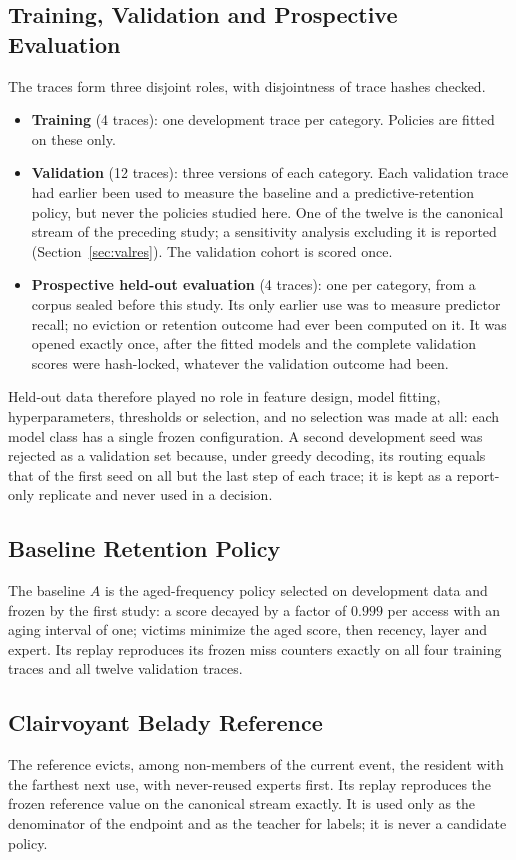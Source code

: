 \documentclass[11pt]{article}
\theoremstyle{plain}
\theoremstyle{definition}
\begin{document}
\subsection{Training, Validation and Prospective Evaluation}
\label{sec:splits}
The traces form three disjoint roles, with disjointness of trace hashes checked.
\begin{itemize}
\item \textbf{Training} (4 traces): one development trace per category. Policies are fitted on these only.
\item \textbf{Validation} (12 traces): three versions of each category. Each validation trace had earlier been used to measure the baseline and a predictive-retention policy, but never the policies studied here. One of the twelve is the canonical stream of the preceding study; a sensitivity analysis excluding it is reported (Section~\ref{sec:valres}). The validation cohort is scored once.
\item \textbf{Prospective held-out evaluation} (4 traces): one per category, from a corpus sealed before this study. Its only earlier use was to measure predictor recall; no eviction or retention outcome had ever been computed on it. It was opened exactly once, after the fitted models and the complete validation scores were hash-locked, whatever the validation outcome had been.
\end{itemize}
Held-out data therefore played no role in feature design, model fitting, hyperparameters, thresholds or selection, and no selection was made at all: each model class has a single frozen configuration. A second development seed was rejected as a validation set because, under greedy decoding, its routing equals that of the first seed on all but the last step of each trace; it is kept as a report-only replicate and never used in a decision.

\subsection{Baseline Retention Policy}
\label{sec:baseline}
The baseline $A$ is the aged-frequency policy selected on development data and frozen by the first study: a score decayed by a factor of $0.999$ per access with an aging interval of one; victims minimize the aged score, then recency, layer and expert. Its replay reproduces its frozen miss counters exactly on all four training traces and all twelve validation traces.

\subsection{Clairvoyant Belady Reference}
\label{sec:belady}
The reference evicts, among non-members of the current event, the resident with the farthest next use, with never-reused experts first. Its replay reproduces the frozen reference value on the canonical stream exactly. It is used only as the denominator of the endpoint and as the teacher for labels; it is never a candidate policy.
\end{document}
